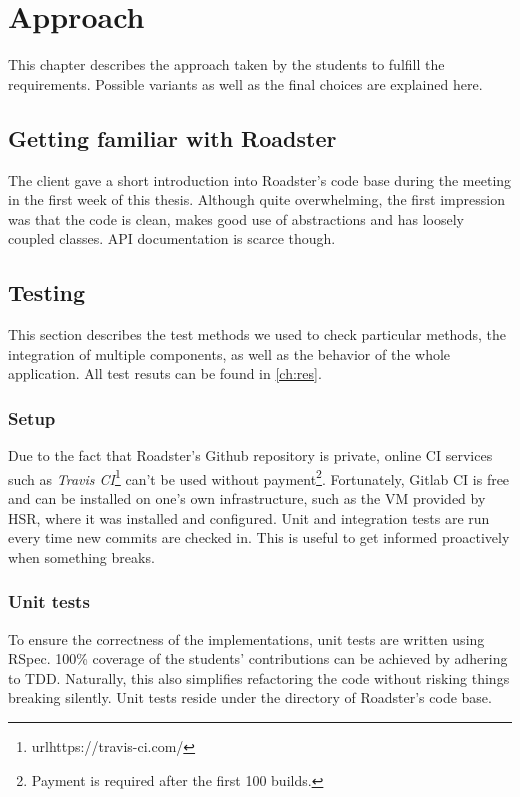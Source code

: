 \chapter{Approach}
This chapter describes the approach taken by the students to fulfill the
requirements. Possible variants as well as the final choices are explained here.

\section{Getting familiar with Roadster}
The client gave a short introduction into Roadster's code base during the meeting in the first
week of this thesis. Although quite overwhelming, the first impression was that
the code is clean, makes good use of abstractions and has loosely coupled
classes. API documentation is scarce though.


\section{Testing}
This section describes the test methods we used to check particular methods,
the integration of multiple components, as well as the behavior of the whole application.
All test resuts can be found in \autoref{ch:res}.

\subsection{Setup}
Due to the fact that Roadster's Github repository is private, online \gls{CI}
services such as \emph{Travis
CI}\footnote{url{https://travis-ci.com/}} can't be used without
payment\footnote{Payment is required after the first 100 builds.}. Fortunately,
Gitlab CI is free and can be installed on one's own infrastructure, such as the
\gls{VM} provided by HSR, where it was installed and configured. Unit and
integration tests are run every time new commits are checked in. This is useful
to get informed proactively when something breaks.

\subsection{Unit tests}
To ensure the correctness of the implementations, unit tests are written using
RSpec. 100\% coverage of the students' contributions can be achieved by
adhering to \gls{TDD}. Naturally, this also simplifies refactoring the code
without risking things breaking silently. Unit tests reside under the 
directory of Roadster's code base.

